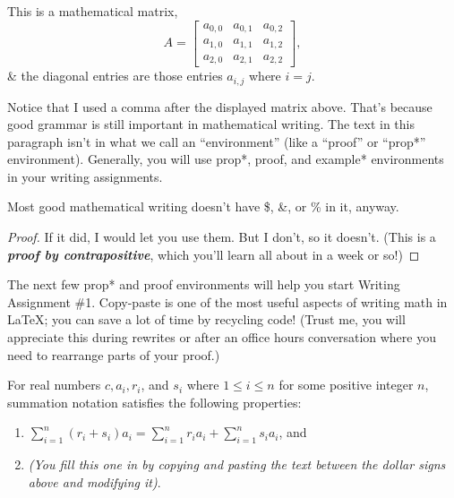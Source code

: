 \documentclass{amsart}
\begin{document}
\begin{example*}[p 314] This is a mathematical matrix,
\[ A = \begin{bmatrix}
a_{0,0} & a_{0,1} & a_{0,2} \\
a_{1,0} & a_{1,1} & a_{1,2} \\
a_{2,0} & a_{2,1} & a_{2,2}
\end{bmatrix},
\] \& the diagonal entries are those entries $a_{i,j}$ where $i = j$.
\end{example*}

Notice that I used a comma after the displayed matrix above.  That's because good grammar is still important in mathematical writing.  The text in this paragraph isn't in what we call an ``environment'' (like a ``proof'' or ``prop*'' environment).  Generally, you will use prop*, proof, and example* environments in your writing assignments.

\begin{prop*} Most good mathematical writing doesn't have \$, \&, or \% in it, anyway.\end{prop*}

\begin{proof} If it did, I would let you use them. But I don't, so it doesn't.  (This is a \textit{\textbf{proof by contrapositive}}, which you'll learn all about in a week or so!) \end{proof}

The next few prop* and proof environments will help you start Writing Assignment \#1.  Copy-paste is one of the most useful aspects of writing math in \LaTeX; you can save a lot of time by recycling code! (Trust me, you will appreciate this during rewrites or after an office hours conversation where you need to rearrange parts of your proof.)

\begin{prop*}[\S1.2, \#17] For real numbers $c, a_i, r_i$, and $s_i$ where $1 \leq i \leq n$ for some positive integer $n$, summation notation satisfies the following properties:
\begin{enumerate}
\item $\sum_{i=1}^n (r_i+s_i) a_i = \sum_{i =1}^n r_i a_i + \sum_{i = 1}^n s_i a_i$, and
\item \textit{(You fill this one in by copying and pasting the text between the dollar signs above and modifying it)}.
\end{enumerate}
\end{prop*}
\end{document}
